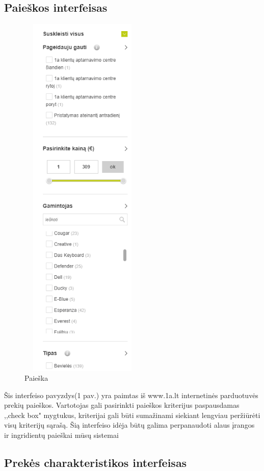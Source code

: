 \documentclass[oneside]{VUMIFPSkursinis}
\begin{document}
	\subsection{Paieškos interfeisas}
		\begin{figure}[h]
			\centering
			\includegraphics[width=6cm,height=18cm,keepaspectratio]{IkvepiantisInterfeisas1.png}
			\caption{ Paieška}
		\end{figure}

			Šis interfeiso pavyzdys(1 pav.) yra paimtas iš www.1a.lt internetinės parduotuvės prekių paieškos. 
			Vartotojas gali pasirinkti paieškos kriterijus paspausdamas ,,check box" mygtukus, kriterijai gali būti sumažinami siekiant lengviau peržiūrėti visų kriterijų sąrašą. 
			Šią interfeiso idėja būtų galima perpanaudoti alaus įrangos ir ingridientų paieškai mūsų sistemai
	\pagebreak
	\subsection{Prekės charakteristikos interfeisas}
		
\end{document}
